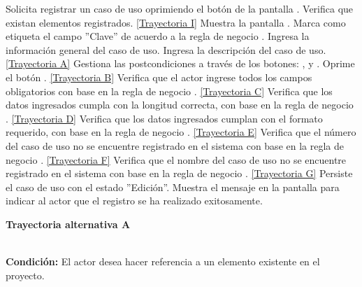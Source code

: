 	\begin{UCtrayectoria}
		\UCpaso[\UCactor] Solicita registrar un caso de uso oprimiendo el botón  de la pantalla .
		\UCpaso[\UCsist] Verifica que existan elementos registrados. \hyperlink{CU12-1:TAI}{[Trayectoria I]}
		\UCpaso[\UCsist] Muestra la pantalla .\label{CU12.1-P2}
		\UCpaso[\UCsist] Marca como etiqueta el campo ''Clave'' de acuerdo a la regla de negocio .
		\UCpaso[\UCactor] Ingresa la información general del caso de uso. \label{CU12.1-P12}
		\UCpaso[\UCactor] Ingresa la descripción del caso de uso. \hyperlink{CU12-1:TAA}{[Trayectoria A]}
		\UCpaso[\UCactor] Gestiona las postcondiciones a través de los botones: , \editar y \eliminar. \label{CU12.1-P18}
		\UCpaso[\UCactor] Oprime el botón . \label{CU12.1-P5} \hyperlink{CU12-1:TAB}{[Trayectoria B]}
		\UCpaso[\UCsist] Verifica que el actor ingrese todos los campos obligatorios con base en la regla de negocio . \hyperlink{CU12-1:TAC}{[Trayectoria C]}
		\UCpaso[\UCsist] Verifica que los datos ingresados cumpla con la longitud correcta, con base en la regla de negocio . \hyperlink{CU12-1:TAD}{[Trayectoria D]}
		\UCpaso[\UCsist] Verifica que los datos ingresados cumplan con el formato requerido, con base en la regla de negocio . \hyperlink{CU12-1:TAE}{[Trayectoria E]}
		\UCpaso[\UCsist] Verifica que el número del caso de uso no se encuentre registrado en el sistema con base en la regla de negocio . \hyperlink{CU12-1:TAF}{[Trayectoria F]}
		\UCpaso[\UCsist] Verifica que el nombre del caso de uso no se encuentre registrado en el sistema con base en la regla de negocio . \hyperlink{CU12-1:TAG}{[Trayectoria G]}
		\UCpaso[\UCsist] Persiste el caso de uso con el estado ''Edición''.
		\UCpaso[\UCsist] Muestra el mensaje  en la pantalla  para indicar al actor que el registro se ha realizado exitosamente.
	\end{UCtrayectoria}		
\hypertarget{CU12-1:TAA}{\textbf{Trayectoria alternativa A}}\\
\noindent \textbf{Condición:} El actor desea hacer referencia a un elemento existente en el proyecto.
